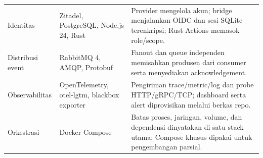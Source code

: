 \begin{longtable}{@{}P{3cm}P{3.6cm}P{8.2cm}@{}}
Identitas & Zitadel, PostgreSQL, Node.js 24, Rust & Provider mengelola akun; bridge menjalankan OIDC dan sesi SQLite terenkripsi; Rust Actions memasok role/scope.\\
Distribusi event & RabbitMQ 4, AMQP, Protobuf & Fanout dan queue independen memisahkan produsen dari consumer serta menyediakan acknowledgement.\\
Observabilitas & OpenTelemetry, otel-lgtm, blackbox exporter & Pengiriman trace/metric/log dan probe HTTP/gRPC/TCP; dashboard serta alert diprovisikan melalui berkas repo.\\
Orkestrasi & Docker Compose & Batas proses, jaringan, volume, dan dependensi dinyatakan di satu stack utama; Compose khusus dipakai untuk pengembangan parsial.\\\bottomrule
\end{longtable}

